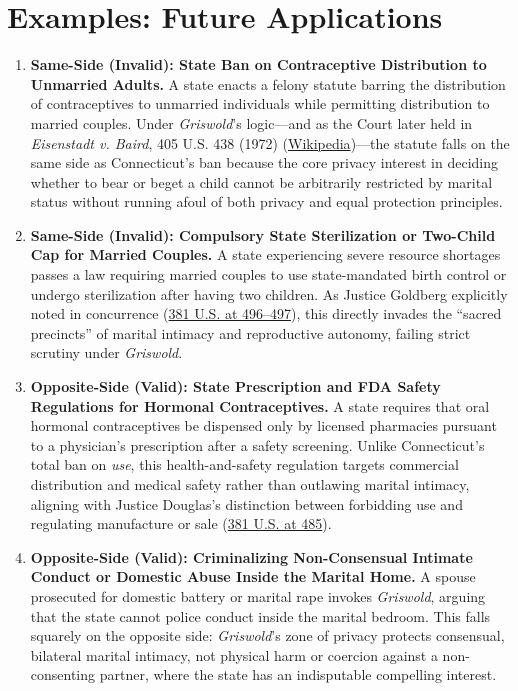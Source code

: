 \documentclass[12pt]{article}
\begin{document}
\section{Examples: Future Applications}
\begin{enumerate}
    \item \textbf{Same-Side (Invalid): State Ban on Contraceptive Distribution to Unmarried Adults.} A state enacts a felony statute barring the distribution of contraceptives to unmarried individuals while permitting distribution to married couples. Under \textit{Griswold}'s logic---and as the Court later held in \textit{Eisenstadt v. Baird}, 405 U.S. 438 (1972) (\href{https://en.wikipedia.org/wiki/Griswold_v._Connecticut}{Wikipedia})---the statute falls on the same side as Connecticut's ban because the core privacy interest in deciding whether to bear or beget a child cannot be arbitrarily restricted by marital status without running afoul of both privacy and equal protection principles.
    \item \textbf{Same-Side (Invalid): Compulsory State Sterilization or Two-Child Cap for Married Couples.} A state experiencing severe resource shortages passes a law requiring married couples to use state-mandated birth control or undergo sterilization after having two children. As Justice Goldberg explicitly noted in concurrence (\href{https://supreme.justia.com/cases/federal/us/381/479/}{381 U.S. at 496--497}), this directly invades the ``sacred precincts'' of marital intimacy and reproductive autonomy, failing strict scrutiny under \textit{Griswold}.
    \item \textbf{Opposite-Side (Valid): State Prescription and FDA Safety Regulations for Hormonal Contraceptives.} A state requires that oral hormonal contraceptives be dispensed only by licensed pharmacies pursuant to a physician's prescription after a safety screening. Unlike Connecticut's total ban on \textit{use}, this health-and-safety regulation targets commercial distribution and medical safety rather than outlawing marital intimacy, aligning with Justice Douglas's distinction between forbidding use and regulating manufacture or sale (\href{https://supreme.justia.com/cases/federal/us/381/479/}{381 U.S. at 485}).
    \item \textbf{Opposite-Side (Valid): Criminalizing Non-Consensual Intimate Conduct or Domestic Abuse Inside the Marital Home.} A spouse prosecuted for domestic battery or marital rape invokes \textit{Griswold}, arguing that the state cannot police conduct inside the marital bedroom. This falls squarely on the opposite side: \textit{Griswold}'s zone of privacy protects consensual, bilateral marital intimacy, not physical harm or coercion against a non-consenting partner, where the state has an indisputable compelling interest.

\end{enumerate}
\end{document}
